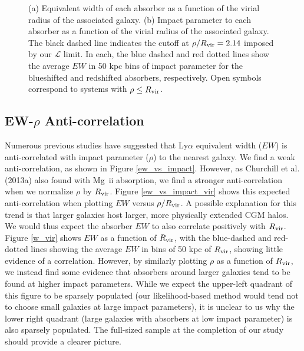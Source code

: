 \begin{figure}[ht]
\centering
{}
\caption{\small{(a) Equivalent width of each absorber as a function of the virial radius of the associated galaxy. (b) Impact parameter to each absorber as a function of the virial radius of the associated galaxy. The black dashed line indicates the cutoff at $\rho/R_{\rm vir} =2.14$ imposed by our $\mathcal{L}$ limit.} In each, the blue dashed and red dotted lines show the average $EW$ in 50 kpc bins of impact parameter for the blueshifted and redshifted absorbers, respectively. Open symbols correspond to systems with $\rho \leq R_{\rm vir}$.}
\vspace{5pt}
\end{figure}


\vspace{10pt}


\subsection{EW-$\rho$ Anti-correlation}
\label{ew}

Numerous previous studies have suggested that Ly$\alpha$ equivalent width ($EW$) is anti-correlated with impact parameter ($\rho$) to the nearest galaxy. We find a weak anti-correlation, as shown in Figure \ref{ew_vs_impact}. However, as Churchill et al. (2013a) also found with Mg \,{\sc ii} absorption, we find a stronger anti-correlation when we normalize $\rho$ by $R_{\rm vir}$. Figure \ref{ew_vs_impact_vir} shows this expected anti-correlation when plotting $EW$ versus $\rho/R_{\rm vir}$. A possible explanation for this trend is that larger galaxies host larger, more physically extended CGM halos. We would thus expect the absorber $EW$ to also correlate positively with $R_{\rm vir}$. Figure \ref{w_vir} shows $EW$ as a function of $R_{\rm vir}$, with the blue-dashed and red-dotted lines showing the average $EW$ in bins of 50 kpc of $R_{\rm vir}$, showing little evidence of a correlation. However, by similarly plotting $\rho$ as a function of $R_{\rm vir}$, we instead find some evidence that absorbers around larger galaxies tend to be found at higher impact parameters. While we expect the upper-left quadrant of this figure to be sparsely populated (our likelihood-based method would tend not to choose small galaxies at large impact parameters), it is unclear to us why the lower right quadrant (large galaxies with absorbers at low impact parameter) is also sparsely populated. The full-sized sample at the completion of our study should provide a clearer picture.


